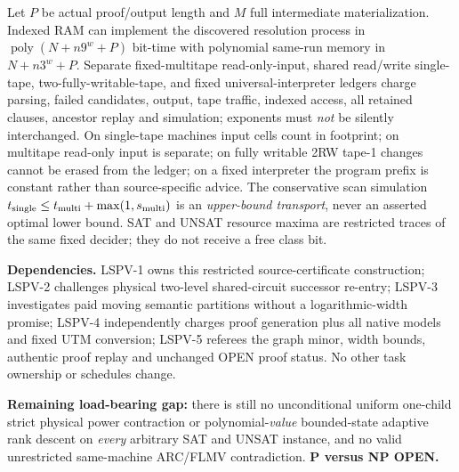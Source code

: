 \documentclass[11pt]{article}
\begin{document}
Let $P$ be actual proof/output length and $M$ full intermediate materialization. Indexed RAM can implement the discovered resolution process in $\operatorname{poly}(N+n9^w+P)$ bit-time with polynomial same-run memory in $N+n3^w+P$. Separate fixed-multitape read-only-input, shared read/write single-tape, two-fully-writable-tape, and fixed universal-interpreter ledgers charge parsing, failed candidates, output, tape traffic, indexed access, all retained clauses, ancestor replay and simulation; exponents must \emph{not} be silently interchanged. On single-tape machines input cells count in footprint; on multitape read-only input is separate; on fully writable 2RW tape-1 changes cannot be erased from the ledger; on a fixed interpreter the program prefix is constant rather than source-specific advice. The conservative scan simulation $t_{\rm single}\le t_{\rm multi}+\max(1,s_{\rm multi})$ is an \emph{upper-bound transport}, never an asserted optimal lower bound. SAT and UNSAT resource maxima are restricted traces of the same fixed decider; they do not receive a free class bit.

\noindent\textbf{Dependencies.} LSPV-1 owns this restricted source-certificate construction; LSPV-2 challenges physical two-level shared-circuit successor re-entry; LSPV-3 investigates paid moving semantic partitions without a logarithmic-width promise; LSPV-4 independently charges proof generation plus all native models and fixed UTM conversion; LSPV-5 referees the graph minor, width bounds, authentic proof replay and unchanged OPEN proof status. No other task ownership or schedules change.

\noindent\textbf{Remaining load-bearing gap:} there is still no unconditional uniform one-child strict physical power contraction or polynomial-\emph{value} bounded-state adaptive rank descent on \emph{every} arbitrary SAT and UNSAT instance, and no valid unrestricted same-machine ARC/FLMV contradiction. \textbf{P versus NP OPEN.}
\end{document}
